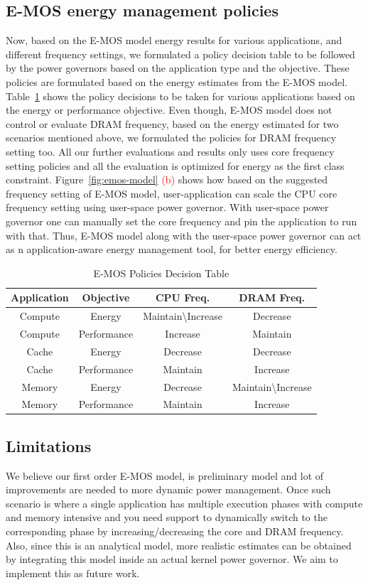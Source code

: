 \subsection{E-MOS energy management policies}
Now, based on the E-MOS model energy results for various applications, and different frequency 
settings, we formulated a policy decision table to be followed by the power governors based on the 
application type and the objective. These policies are formulated based on
the energy estimates from the E-MOS model. Table~\ref{tbl:emos-dec} shows the policy
decisions to be taken for various applications based on the energy or performance objective.
Even though, E-MOS model does not control or evaluate DRAM frequency, based on the energy estimated
for two scenarios mentioned above, we formulated the policies for DRAM frequency setting too.
All our further evaluations and results only uses core frequency setting policies and all the evaluation is
optimized for energy as the first class constraint. Figure~\ref{fig:emos-model} \textcolor{red}{(b)} shows
how based on the suggested frequency setting of E-MOS model, user-application can scale the CPU core
frequency setting using user-space power governor. With user-space power governor one can manually set the core frequency
and pin the application to run with that. Thus, E-MOS model along with the user-space power governor
can act as n application-aware energy management tool, for better energy efficiency. 

\begin{table}[h]
\footnotesize
\def\arraystretch{0.52}
\setlength{\tabcolsep}{.15em}
\center
\begin{tabular}{cccc} \toprule
Application & Objective & CPU Freq. & DRAM Freq.  \\ \midrule
Compute & Energy & Maintain\textbackslash{Increase} & Decrease \\
Compute & Performance & Increase & Maintain \\
Cache  & Energy &  Decrease & Decrease \\ 
Cache  & Performance &  Maintain & Increase \\ 
Memory & Energy & Decrease & Maintain\textbackslash{Increase} \\
Memory & Performance & Maintain & Increase \\ \midrule
\end{tabular}
\caption{E-MOS Policies Decision Table}\label{tbl:emos-dec}
\end{table}

\subsection{Limitations}
We believe our first order E-MOS model, is preliminary model
and lot of improvements are needed to more dynamic power management. 
Once such scenario is where a single application has multiple execution phases with compute and memory intensive
and you need support to dynamically switch to the corresponding phase by increasing/decreasing the core and DRAM
frequency. Also, since this is an analytical model, more realistic estimates can be obtained 
by integrating this model inside an actual kernel power governor. We aim to implement this as future work.
